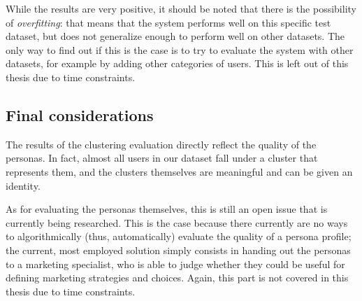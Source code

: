 While the results are very positive, it should be noted that there is the possibility of \emph{overfitting}: that means that the system performs well on this specific test dataset, but does not generalize enough to perform well on other datasets. The only way to find out if this is the case is to try to evaluate the system with other datasets, for example by adding other categories of users. This is left out of this thesis due to time constraints.

\subsection{Final considerations}
The results of the clustering evaluation directly reflect the quality of the personas. In fact, almost all users in our dataset fall under a cluster that represents them, and the clusters themselves are meaningful and can be given an identity.

As for evaluating the personas themselves, this is still an open issue that is currently being researched. This is the case because there currently are no ways to algorithmically (thus, automatically) evaluate the quality of a persona profile; the current, most employed solution simply consists in handing out the personas to a marketing specialist, who is able to judge whether they could be useful for defining marketing strategies and choices. Again, this part is not covered in this thesis due to time constraints.